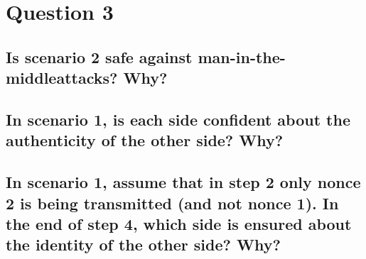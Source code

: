 \documentclass{report}
\begin{document}
	\section{Question 3}
	\startsection
		\renewcommand{\thesubsection}{\thesection.\Alph{subsection}}
		\subsection{Is scenario 2 safe against man-in-the-middleattacks? Why?}
		\startsubsection
		\closesection
		\subsection{In scenario 1, is each side confident about the authenticity of the other side? Why?}
		\startsubsection
		\closesection
		\subsection{In scenario 1, assume that in step 2 only nonce 2 is being transmitted (and not nonce 1). In the end of step 4, which side is ensured about the identity of the other side? Why?}
		\startsubsection
		\closesection
	\closesection
\end{document}
